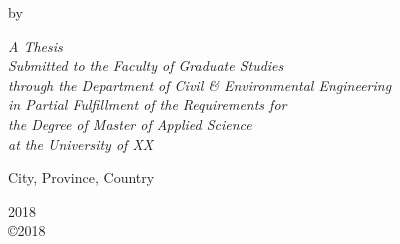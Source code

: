 \documentclass[
11pt, %
oneside, %
english, %
doublespacing,
liststotoc, %
parskip, %
consistentlayout, %
]{MastersDoctoralThesis} %
\author{First \textsc{Last}} %
\begin{document}
\frontmatter

\clearscrheadfoot
\ohead{\rightmark}
\cfoot[\pagemark]{\pagemark}


\pagestyle{plain}
\begin{titlepage}
\begin{center}
{\huge \bfseries \ttitle\par}\vspace{0.4cm} %


\vfill
\large {by}
\\
\large {\authorname}
\vfill

\large \textit{A Thesis \\
  Submitted to the Faculty of Graduate Studies \\
  through the Department of Civil \& Environmental Engineering \\
  in Partial Fulfillment of the Requirements for \\
  the Degree of Master of Applied Science \\
  at the University of XX}

\large {City, Province, Country}

{\large 2018 \\}
\large {\copyright 2018 \authorname}
\vfill
\end{center}
\end{titlepage}

\end{document}
